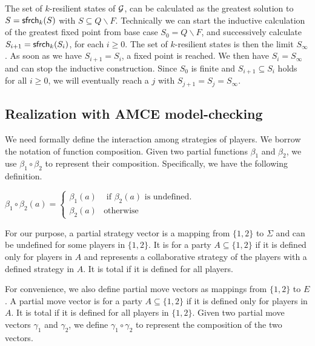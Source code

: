 The set of $k$-resilient states of ${\cal G}$, 
can be calculated as the greatest solution to 
$S=\mathsf{sfrch}_k(S)$ with $S\subseteq Q\smallsetminus F$. 
Technically\label{reply2.technically.comma} we can start the inductive calculation of the greatest fixed point 
from base case $S_0 = Q \smallsetminus F$, 
and successively calculate $S_{i+1} = \mathsf{sfrch}_k(S_i)$, 
for each $i\geq 0$. 
The set of $k$-resilient states is then the limit $S_\infty$.  
As soon as we have $S_{i+1}=S_i$, a fixed point is reached.
We then have $S_i=S_\infty$ and can stop the 
inductive construction.  
Since $S_0$ is finite and $S_{i+1}\subseteq S_i$ holds for all $i\geq 0$, 
we will eventually reach a $j$ with $S_{j+1}=S_j=S_\infty$. 
\subsection{Realization with AMCE model-checking}
We need formally define the interaction among strategies of players. 
We borrow the notation of function composition. 
Given two partial functions $\beta_1$ and $\beta_2$, 
we use $\beta_1\circ \beta_2$ to represent their composition.  
Specifically, we have the following definition.  
\begin{center} 
$\beta_1\circ\beta_2(a)=\left\{\begin{array}{ll} 
\beta_1(a) & \mbox{ if } \beta_2(a)\mbox{ is undefined}.\\
\beta_2(a) & %
\mbox{otherwise} 
\end{array}\right.$
\label{reply1.compose} 
\end{center} 
% 
For our purpose, a partial strategy vector is a mapping from $\{1,2\}$ to $\Sigma$ 
and can be undefined for some players in $\{1,2\}$.  
It is for a party $A\subseteq \{1,2\}$ if it is defined only for players in $A$
and represents a collaborative strategy of the players with a 
defined strategy in $A$.  
It is total if it is defined for all players.  


For convenience, we also define partial move vectors 
as mappings\label{reply2.mapping.s} from $\{1,2\}$ to $E$.  
A partial move vector is for a party $A\subseteq\{1,2\}$ if it is defined only for players in $A$.  
It is total if it is defined for all players in $\{1,2\}$.  
Given two partial move vectors $\gamma_1$ and $\gamma_2$, \label{reply1.m2gamma} 
we define $\gamma_1\circ\gamma_2$ to represent the composition of 
the two vectors.  

